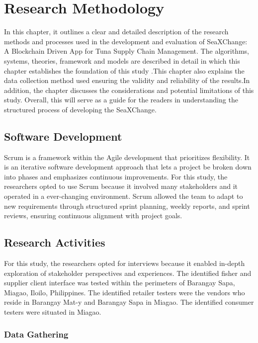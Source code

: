 \chapter{Research Methodology}
In this chapter, it outlines a clear and detailed description of the research methods and processes used in the development and evaluation of SeaXChange: A Blockchain Driven App for Tuna Supply Chain Management. The algorithms, systems, theories, framework and models are described in detail in which this chapter establishes the foundation of this study .This chapter also explains the data collection method used ensuring the validity and reliability of the results.In addition, the chapter discusses the considerations and potential limitations of this study. Overall, this will serve as a guide for the readers in understanding the structured process of developing the SeaXChange.

\section{Software Development}
Scrum is a framework within the Agile development that prioritizes flexibility. It is an iterative software development approach that lets a project be broken down into phases and emphasizes continuous improvements. For this study, the researchers opted to use Scrum  because it involved many stakeholders and it operated in a ever-changing environment. Scrum allowed the team to adapt to new requirements through structured sprint planning, weekly reports, and sprint reviews, ensuring continuous alignment with project goals.
\section{Research Activities}
For this study, the researchers opted for interviews because it enabled in-depth exploration of stakeholder perspectives and experiences. 
The identified fisher and supplier client interface was tested within the perimeters of Barangay Sapa, Miagao, Iloilo, Philippines. The identified retailer testers were the vendors who reside in Barangay Mat-y and Barangay Sapa in Miagao. The identified consumer testers were situated in Miagao. 

\subsection{Data Gathering}

